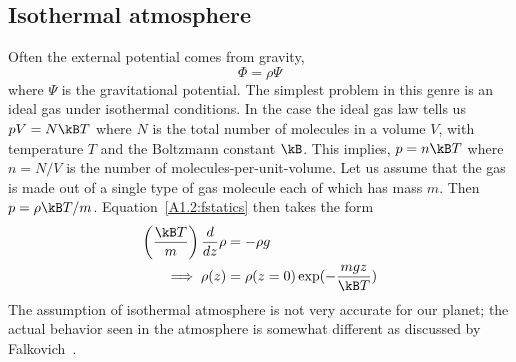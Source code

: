 \subsection{Isothermal atmosphere}
Often the external potential comes from gravity, 
\begin{equation}
\Phi = \rho\Psi
\end{equation}
where $\Psi$ is the gravitational potential. 
The simplest problem in this genre is an ideal gas under isothermal
conditions. In the case the ideal gas law tells us $pV = N\kB T$
where $N$ is the total number of molecules in a volume $V$, with
temperature $T$ and the Boltzmann constant $\kB$. This implies,
$p=n\kB T $ where $n=N/V$ is the number of molecules-per-unit-volume. 
Let us assume that the gas is made out of a single type of gas
molecule each of which has mass $m$. Then 
$p=\rho\kB T/m $. Equation~\ref{A1.2:fstatics} then takes the form
\begin{subequations}
\begin{align}
\left(\frac{\kB T}{m}\right)\frac{d}{dz} \rho &= -\rho g  \\
\implies \rho(z) &= \rho(z=0)\exp(-\frac{mgz}{\kB T})
\end{align}
\end{subequations}
The assumption of isothermal atmosphere is not very accurate for our
planet; the actual behavior seen in the atmosphere is somewhat
different as discussed by Falkovich~\cite{Falkovich2018fluid}.
